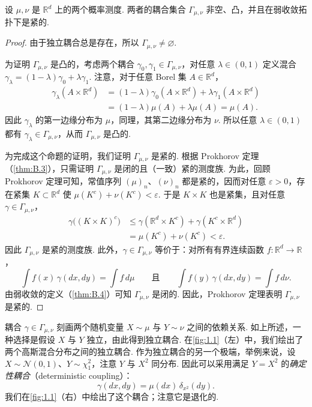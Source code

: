 \begin{proposition}\label{prop:1.1}
设 $\mu,\nu$ 是 $\mathbb R^d$ 上的两个概率测度. 两者的耦合集合 $\Gamma_{\mu,\nu}$ 非空、凸，并且在弱收敛拓扑下是紧的.
\end{proposition}
\begin{proof}
由于独立耦合总是存在，所以 $\Gamma_{\mu,\nu}\ne\varnothing$.

为证明 $\Gamma_{\mu,\nu}$ 是凸的，考虑两个耦合 $\gamma_0,\gamma_1\in\Gamma_{\mu,\nu}$，对任意 $\lambda\in(0,1)$ 定义混合 $\gamma_\lambda=(1-\lambda)\gamma_0+\lambda\gamma_1$. 注意，对于任意 Borel 集 $A\in\mathbb R^d$，
$$
\begin{aligned}
\gamma_\lambda(A\times\mathbb R^d)
&=(1-\lambda)\gamma_0(A\times\mathbb R^d)+\lambda\gamma_1(A\times\mathbb R^d)\\
&=(1-\lambda)\mu(A)+\lambda\mu(A)=\mu(A).
\end{aligned}
$$
因此 $\gamma_\lambda$ 的第一边缘分布为 $\mu$，同理，其第二边缘分布为 $\nu$. 所以任意 $\lambda\in(0,1)$ 都有 $\gamma_\lambda\in\Gamma_{\mu,\nu}$，从而 $\Gamma_{\mu,\nu}$ 是凸的.

为完成这个命题的证明，我们证明 $\Gamma_{\mu,\nu}$ 是紧的. 根据 Prokhorov 定理（\autoref{thm:B.3}），只需证明 $\Gamma_{\mu,\nu}$ 是闭的且（一致）紧的测度族. 为此，回顾 Prokhorov 定理可知，常值序列 $(\mu)_n$、$(\nu)_n$ 都是紧的，因而对任意 $\varepsilon>0$，存在紧集 $K\subset\mathbb R^d$ 使 $\mu(K^c)+\nu(K^c)<\varepsilon$. 于是 $K\times K$ 也是紧集，且对任意 $\gamma\in\Gamma_{\mu,\nu}$，
$$
\begin{aligned}
\gamma\bigl((K\times K)^c\bigr)
&\le\gamma(\mathbb R^d\times K^c)+\gamma(K^c\times\mathbb R^d)\\
&=\mu(K^c)+\nu(K^c)<\varepsilon.
\end{aligned}
$$
因此 $\Gamma_{\mu,\nu}$ 是紧的测度族. 此外，$\gamma\in\Gamma_{\mu,\nu}$ 等价于：对所有有界连续函数 $f:\mathbb R^d\to\mathbb R$，
$$
\int f(x)\,\gamma(dx,dy)=\int f\,d\mu
\qquad\text{且}\qquad
\int f(y)\,\gamma(dx,dy)=\int f\,d\nu.
$$
由弱收敛的定义（\autoref{thm:B.4}）可知 $\Gamma_{\mu,\nu}$ 是闭的. 因此，Prokhorov 定理表明 $\Gamma_{\mu,\nu}$ 是紧的.
\end{proof}

耦合 $\gamma\in\Gamma_{\mu,\nu}$ 刻画两个随机变量 $X\sim\mu$ 与 $Y\sim\nu$ 之间的依赖关系. 如上所述，一种选择是假设 $X$ 与 $Y$ 独立，由此得到独立耦合. 在\autoref{fig:1.1}（左）中，我们绘出了两个高斯混合分布之间的独立耦合. 作为独立耦合的另一个极端，举例来说，设 $X\sim\mathcal N(0,1)$、$Y\sim\chi_1^2$，注意 $Y$ 与 $X^2$ 同分布. 因此可以采用满足 $Y=X^2$ 的\emph{确定性耦合}（deterministic coupling）：
$$
\gamma(dx,dy)=\mu(dx)\,\delta_{x^2}(dy).
$$
我们在\autoref{fig:1.1}（右）中绘出了这个耦合；注意它是退化的.

